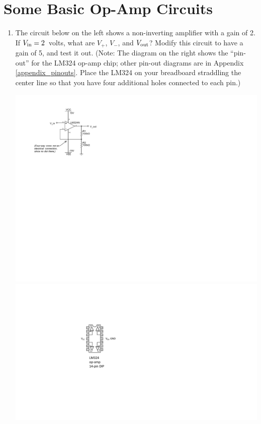 \section{Some Basic Op-Amp Circuits}
\label{lab_op-amps}


\bigskip

\begin{enumerate}[wide]

\item The circuit below on the left shows a non-inverting amplifier with a gain of 2.  If $V_{\rm in} = 2$~volts, what are $V_+$, $V_-$, and $V_{\rm out}$?  Modify this circuit to have a gain of 5, and test it out. (Note: The diagram on the right shows the ``pin-out'' for the LM324 op-amp chip; other pin-out diagrams are in Appendix \ref{appendix_pinouts}.  Place the LM324 on your breadboard straddling the center line so that you have four additional holes connected to each pin.)
\begin{center}
\includegraphics{op-amps/noninverting.pdf}
\hspace{0.2in}
\includegraphics[scale=0.8]{appendices/pinouts/lm324.pdf}
\end{center}
\label{part_non-inverting_amplifier}


\end{enumerate}

